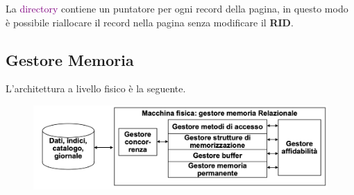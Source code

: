 La \textcolor{purple}{directory} contiene un puntatore per ogni record
della pagina, in questo modo è possibile riallocare il record nella pagina
senza modificare il \textbf{RID}.

\subsection{Gestore Memoria}

L'architettura a livello fisico è la seguente.
\begin{figure}[H]
    \centering
    \includegraphics[scale=0.4]{img/macchina_fisica.png}
\end{figure}

